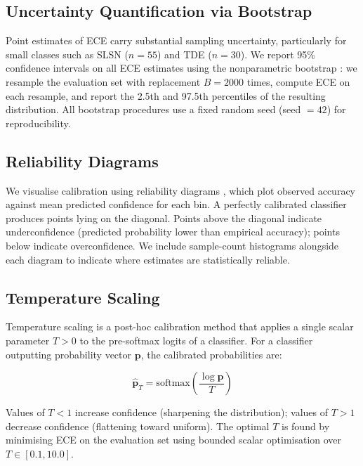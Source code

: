 \subsection{Uncertainty Quantification via Bootstrap}
\label{sec:methods:bootstrap}

Point estimates of ECE carry substantial sampling uncertainty, 
particularly for small classes such as SLSN ($n=55$) and TDE ($n=30$). 
We report 95\% confidence intervals on all ECE estimates using the 
nonparametric bootstrap \citep{Efron1979}: we resample the evaluation 
set with replacement $B = 2000$ times, compute ECE on each resample, 
and report the 2.5th and 97.5th percentiles of the resulting 
distribution. All bootstrap procedures use a fixed random seed 
(seed $= 42$) for reproducibility.

\subsection{Reliability Diagrams}
\label{sec:methods:reliability}

We visualise calibration using reliability diagrams \citep{DeGroot1983}, 
which plot observed accuracy against mean predicted confidence for each 
bin. A perfectly calibrated classifier produces points lying on the 
diagonal. Points above the diagonal indicate underconfidence 
(predicted probability lower than empirical accuracy); points below 
indicate overconfidence. We include sample-count histograms alongside 
each diagram to indicate where estimates are statistically reliable.

\subsection{Temperature Scaling}
\label{sec:methods:tempscaling}

Temperature scaling \citep{Guo2017} is a post-hoc calibration method 
that applies a single scalar parameter $T > 0$ to the pre-softmax 
logits of a classifier. For a classifier outputting probability vector 
$\mathbf{p}$, the calibrated probabilities are:

\begin{equation}
\hat{\mathbf{p}}_T = \mathrm{softmax}\!\left(\frac{\log \mathbf{p}}{T}\right)
\label{eq:tempscaling}
\end{equation}

Values of $T < 1$ increase confidence (sharpening the distribution); 
values of $T > 1$ decrease confidence (flattening toward uniform). 
The optimal $T$ is found by minimising ECE on the evaluation set 
using bounded scalar optimisation over $T \in [0.1, 10.0]$.


